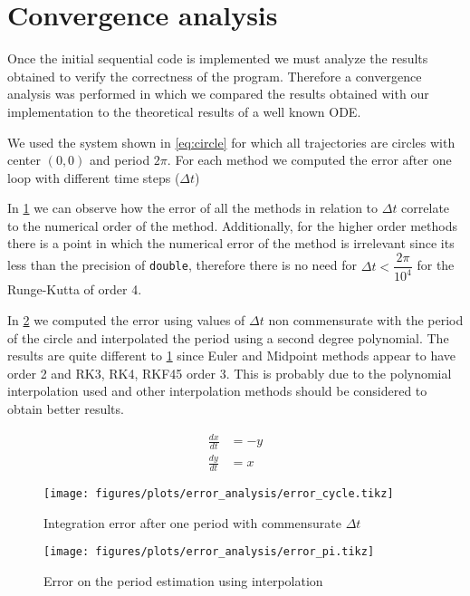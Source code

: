 
\section{Convergence analysis}%
\label{sec:convergence}

Once the initial sequential code is implemented we must analyze the results
obtained to verify the correctness of the program. Therefore a convergence
analysis was performed in which we compared the results obtained with our
implementation to the theoretical results of a well known ODE.

We used the system shown in \cref{eq:circle} for which all trajectories are
circles with center $(0,0)$ and period $2\pi$. For each method we computed the
error after one loop with different time steps ($\Delta t$)

In \cref{fig:error_cycle} we can observe how the error of all the methods
in relation to $\Delta t$ correlate to the numerical order of the method.
Additionally, for the higher order methods there is a point in which the
numerical error of the method is irrelevant since its less than the precision of
\texttt{double}, therefore there is no need for $\Delta t < \dfrac{2\pi}{10^4}$
for the Runge-Kutta of order 4.

In \cref{fig:error_pi} we computed the error using values of $\Delta t$ non commensurate
with the period of the circle and interpolated the period using a second degree
polynomial. The results are quite different to \cref{fig:error_cycle} since
Euler and Midpoint methods appear to have order 2 and RK3, RK4, RKF45 order 3.
This is probably due to the polynomial interpolation used and other
interpolation methods should be considered to obtain better results.

\begin{align}\label{eq:circle}
    \frac{dx}{dt} &= -y \nonumber \\
    \frac{dy}{dt} &= x
\end{align}

\begin{figure}[H]
    \centering
    \texttt{[image: figures/plots/error\_analysis/error\_cycle.tikz]}
    \caption{Integration error after one period with commensurate $\Delta t$}%
    \label{fig:error_cycle}
\end{figure}

\begin{figure}[H]
    \centering
    \texttt{[image: figures/plots/error\_analysis/error\_pi.tikz]}
    \caption{Error on the period estimation using interpolation}%
    \label{fig:error_pi}
\end{figure}
